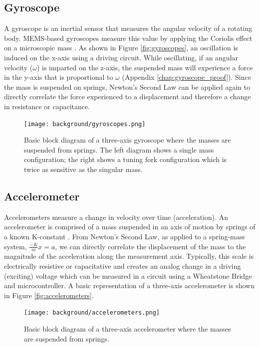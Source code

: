 \subsection{Gyroscope} 
A gyroscope is an inertial sensor that measures the angular velocity of a rotating body.
MEMS-based gyroscopes measure this value by applying the Coriolis effect on a microscopic mass \cite{Corke:2011}.
As shown in Figure \ref{fig:gyroscopes}, an oscillation is induced on the x-axis using a driving circuit.
While oscillating, if an angular velocity ($\omega$) is imparted on the z-axis, the suspended mass will experience a force in the y-axis that is proportional to $\omega$ (Appendix \ref{chap:gyroscope_proof}).
Since the mass is suspended on springs, Newton's Second Law can be applied again to directly correlate the force experienced to a displacement and therefore a change in resistance or capacitance.

\begin{figure}[h!]
    \caption[Gyroscope block diagram]{Basic block diagram of a three-axis gyroscope where the masses are suspended from springs. The left diagram shows a single mass configuration; the right shows a tuning fork configuration which is twice as sensitive as the singular mass.}
    \centering
    \texttt{[image: background/gyroscopes.png]}
\end{figure}

\subsection{Accelerometer} 
Accelerometers measure a change in velocity over time (acceleration).
An accelerometer is comprised of a mass suspended in an axis of motion by springs of a known K-constant \cite{Corke:2011}.
From Newton's Second Law, as applied to a spring-mass system, $\frac{-K}{m}x=a$, we can directly correlate the displacement of the mass to the magnitude of the acceleration along the measurement axis.
Typically, this scale is electrically resistive or capacitative and creates an analog change in a driving (exciting) voltage which can be measured in a circuit using a Wheatstone Bridge and microcontroller.
A basic representation of a three-axis accelerometer is shown in Figure \ref{fig:accelerometers}.

\begin{figure}[h!]
    \caption[Accelerometer block diagram]{Basic block diagram of a three-axis accelerometer where the masses are suspended from springs.}
    \centering
    \texttt{[image: background/accelerometers.png]}
\end{figure}

